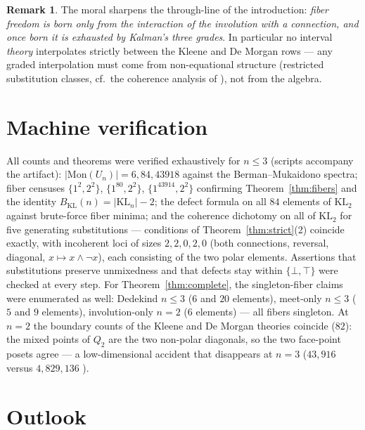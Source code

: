\documentclass[11pt]{amsart}
\theoremstyle{definition}
\newtheorem{rem}[thm]{Remark}
\newcommand{\KL}{\mathrm{KL}}
\newcommand{\lc}{Q}
\newcommand{\uc}{U}
\begin{document}
\begin{rem}
  The moral sharpens the through-line of the introduction:
  \emph{fiber freedom is born only from the interaction of the
  involution with a connection, and once born it is exhausted by
  Kalman's three grades}.  In particular no interval \emph{theory}
  interpolates strictly between the Kleene and De Morgan rows ---
  any graded interpolation must come from non-equational structure
  (restricted substitution classes, cf.\ the coherence analysis of
  \cite{StrictDM}), not from the algebra.
\end{rem}

\section{Machine verification}
\label{sec:machine}

All counts and theorems were verified exhaustively for
$n \leq 3$ (scripts accompany the artifact):
$|\mathrm{Mon}(\uc_n)| = 6, 84, 43918$ against the
Berman--Mukaidono spectra; fiber censuses
$\{1^2, 2^2\}$, $\{1^{80}, 2^{2}\}$, $\{1^{43914}, 2^{2}\}$
confirming Theorem~\ref{thm:fibers} and the identity
$B_{\KL}(n) = |\KL_n| - 2$; the defect formula on all $84$
elements of $\KL_2$ against brute-force fiber minima; and the
coherence dichotomy on all of $\KL_2$ for five generating
substitutions --- conditions of Theorem~\ref{thm:strict}(2)
coincide exactly, with incoherent loci of sizes $2, 2, 0, 2, 0$
(both connections, reversal, diagonal,
$x \mapsto x \wedge \neg x$), each consisting of the two polar
elements.  Assertions that substitutions preserve unmixedness and
that defects stay within $\{\bot, \top\}$ were checked at every
step.  For Theorem~\ref{thm:complete}, the
singleton-fiber claims were enumerated as well: Dedekind
$n \leq 3$ ($6$ and $20$ elements), meet-only $n \leq 3$ ($5$ and
$9$ elements), involution-only $n = 2$ ($6$ elements) --- all
fibers singleton.  At $n = 2$ the boundary counts of the Kleene and De Morgan
theories coincide ($82$): the mixed points of $\lc_2$ are the two
non-polar diagonals, so the two face-point posets agree ---
a low-dimensional accident that disappears at $n = 3$
($43{,}916$ versus $4{,}829{,}136$ \cite{DMFibers}).

\section{Outlook}
\label{sec:outlook}
\end{document}
